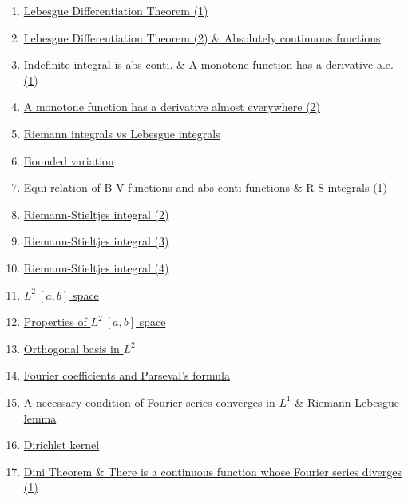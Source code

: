 \documentclass[11pt]{article}
\begin{document}
\begin{enumerate}
	\item	\href{https://mp.weixin.qq.com/s/OIaI3hbwGIUX3Y4e_EROOQ}{Lebesgue Differentiation Theorem (1)}	%
	\item	\href{https://mp.weixin.qq.com/s/drRat8Slew_KFj4Yq6x4JQ}{Lebesgue Differentiation Theorem (2) \& Absolutely continuous functions}	%
	\item	\href{https://mp.weixin.qq.com/s/9YEo-duMYyul3cUzaR-lrA}{Indefinite integral is abs conti. \& A monotone function has a derivative a.e. (1)} 	%
	\item 	\href{https://mp.weixin.qq.com/s/EjT8UKkCGNCbfiaZ1q8Y-w}{A monotone function has a derivative almost everywhere (2)}	%
	\item 	\href{https://mp.weixin.qq.com/s/9lX2gYoJxq8EKLONRnA4yA}{Riemann integrals vs Lebesgue integrals}	%
	\item 	\href{https://mp.weixin.qq.com/s/CMcL5vHqYH6aCJAXlEXDTg}{Bounded variation}	%
	\item 	\href{https://mp.weixin.qq.com/s/41Wz5ruEkfFlmV0KKtpamQ}{Equi relation of B-V functions and abs conti functions \& R-S integrals (1)}	%
	\item 	\href{https://mp.weixin.qq.com/s/Yf_pbXgA5ECfUt3Dr5QTcQ}{Riemann-Stieltjes integral (2)}	%
	\item 	\href{https://mp.weixin.qq.com/s/rqe5FeAjRmbjgZco_anx9g}{Riemann-Stieltjes integral (3)}	%
	\item 	\href{https://mp.weixin.qq.com/s/Qs7EPDpJZEbDnO5Urt_yig}{Riemann-Stieltjes integral (4)}	%
	\item	\href{https://mp.weixin.qq.com/s/loTF6azJc-z9owY5Bl_8RQ}{$L^2 \ [a,b]$ space}	%
	\item	\href{https://mp.weixin.qq.com/s/cs-zNCfw5_Y1NbCyS7wcMw}{Properties of $L^2 \ [a,b]$ space}	%
	\item	\href{https://mp.weixin.qq.com/s/GMPk8UOz4I_GiYxk8TAe7A}{Orthogonal basis in $L^2$} 	%
	\item 	\href{https://mp.weixin.qq.com/s/Zah3Ki2Psq0qEMq2QVGBmw}{Fourier coefficients and Parseval's formula}	%
	\item 	\href{https://mp.weixin.qq.com/s/5GYYVkDfA4MtwhyK_0kDxg}{A necessary condition of Fourier series converges in $L^1$ \& Riemann-Lebesgue lemma}	%
	\item 	\href{https://mp.weixin.qq.com/s/tGHTKUqhFm75t9k3CcjLJA}{Dirichlet kernel}	%
	\item 	\href{https://mp.weixin.qq.com/s/ZD8yJLLhrL6oyO4NBuNL3g}{Dini Theorem \& There is a continuous function whose Fourier series diverges (1)}	%

\end{enumerate}
\end{document}
